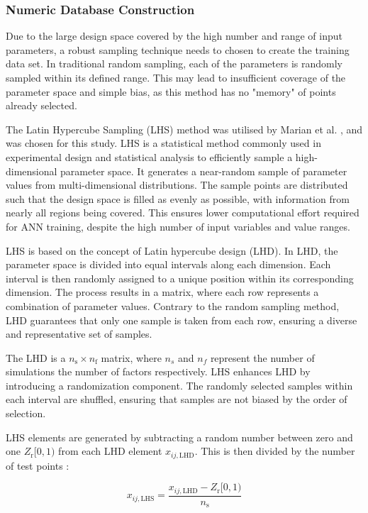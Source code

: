 \subsubsection{Numeric Database Construction}

Due to the large design space covered by the high number and range of input parameters, a robust sampling technique needs to chosen to create the training data set. In traditional random sampling, each of the parameters is randomly sampled within its defined range. This may lead to insufficient coverage of the parameter space and simple bias, as this method has no "memory" of points already selected.

The Latin Hypercube Sampling (LHS) method was utilised by Marian et al. \cite{Marian2022}, and was chosen for this study. LHS is a statistical method commonly used in experimental design and statistical analysis to efficiently sample a high-dimensional parameter space. It generates a near-random sample of parameter values from multi-dimensional distributions. The sample points are distributed such that the design space is filled as evenly as possible, with information from nearly all regions being covered. This ensures lower computational effort required for ANN training, despite the high number of input variables and value ranges. 

LHS is based on the concept of Latin hypercube design (LHD). In LHD, the parameter space is divided into equal intervals along each dimension. Each interval is then randomly assigned to a unique position within its corresponding dimension. The process results in a matrix, where each row represents a combination of parameter values. Contrary to the random sampling method, LHD guarantees that only one sample is taken from each row, ensuring a diverse and representative set of samples.

The LHD is a $n_{\mathrm{s}} \times n_{\mathrm{f}}$ matrix, where $n_s$ and $n_f$ represent the number of simulations the number of factors respectively. LHS enhances LHD by introducing a randomization component. The randomly selected samples within each interval are shuffled, ensuring that samples are not biased by the order of selection.

LHS elements are generated by subtracting a random number between zero and one $Z_{\mathrm{r}}[0,1)$ from each LHD element $x_{i j, \mathrm{LHD}}$. This is then divided by the number of test points \cite{Siebertz2010}:

\begin{equation}\label{LHS}
	x_{i j, \mathrm{LHS}}=\frac{x_{i j, \mathrm{LHD}}-Z_{\mathrm{r}}[0,1)}{n_{\mathrm{s}}}
\end{equation}


